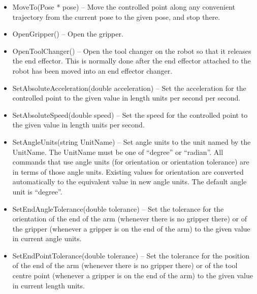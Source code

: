 \begin{itemize}
\item \sf MoveTo(Pose * pose) \rm -- Move the controlled point along any
  convenient trajectory from the current pose to the given \sf pose\rm,
  and stop there.\\

\item \sf OpenGripper() \rm -- Open the gripper.\\

\item \sf OpenToolChanger() \rm -- Open the tool changer on the robot so
  that it releases the end effector.  This is normally done after the end
  effector attached to the robot has been moved into an end effector
  changer.\\

\item \sf SetAbsoluteAcceleration(double acceleration) \rm -- Set the
  acceleration for the controlled point to the given value in length units
  per second per second.\\

\item \sf SetAbsoluteSpeed(double speed) \rm -- Set the speed for the
  controlled point to the given value in length units per second.\\

\item \sf SetAngleUnits(string UnitName) \rm -- Set angle units to the unit
  named by the \sf UnitName\rm.  The \sf UnitName \rm must be one of
  ``degree'' or ``radian''. All commands that use angle units (for
  orientation or orientation tolerance) are in terms of those angle
  units. Existing values for orientation are converted automatically to the
  equivalent value in new angle units.  The default angle unit is
  ``degree''.\\

\item \sf SetEndAngleTolerance(double tolerance) \rm -- Set the tolerance
  for the orientation of the end of the arm (whenever there is no gripper
  there) or of the gripper (whenever a gripper is on the end of the arm) to
  the given value in current angle units.\\

\item \sf SetEndPointTolerance(double tolerance) \rm -- Set the tolerance
  for the position of the end of the arm (whenever there is no gripper
  there) or of the tool centre point (whenever a gripper is on the end of
  the arm) to the given value in current length units.\\


\end{itemize}
